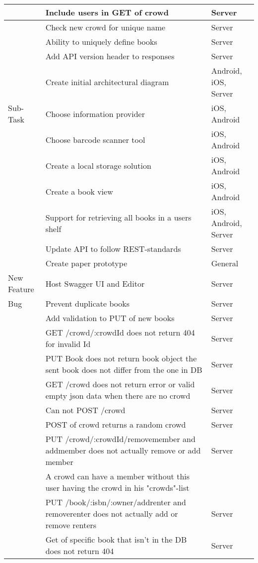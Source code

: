 \begin{longtable}{|L{2cm}|L{10cm}|L{3cm}|}
 \hline
 & Include users in GET of crowd & Server \\
 \hline
 & Check new crowd for unique name & Server \\
 \hline
 & Ability to uniquely define books & Server \\
 \hline
 & Add API version header to responses & Server \\
 \hline
  & Create initial architectural diagram & Android, iOS, Server \\
  \hline
Sub-Task & Choose information provider & iOS, Android \\
\hline
 & Choose barcode scanner tool & iOS, Android \\
 \hline
 & Create a local storage solution & iOS, Android \\
 \hline
 & Create a book view & iOS, Android \\
 \hline
 & Support for retrieving all books in a users shelf & iOS, Android, Server \\
 \hline
 & Update API to follow REST-standards & Server \\
 \hline
 & Create paper prototype & General \\
 \hline
New Feature & Host Swagger UI and Editor & Server \\
\hline
Bug & Prevent duplicate books & Server \\
\hline
 & Add validation to PUT of new books & Server \\
 \hline
 & GET /crowd/:crowdId does not return 404 for invalid Id & Server \\
 \hline
 & PUT Book does not return book object the sent book does not differ from the one in DB & Server \\
 \hline
 & GET /crowd does not return error or valid empty json data when there are no crowd & Server \\
 \hline
 & Can not POST /crowd & Server \\
 \hline
 & POST of crowd returns a random crowd & Server \\
 \hline
 & PUT /crowd/:crowdId/removemember and addmember does not actually remove or add member & Server \\
 \hline
 & A crowd can have a member without this user having the crowd in his "crowds"-list &  \\
 \hline
 & PUT /book/:isbn/:owner/addrenter and removerenter does not actually add or remove renters & Server \\
 \hline
 & Get of specific book that isn't in the DB does not return 404 & Server \\
 \hline
\end{longtable}
